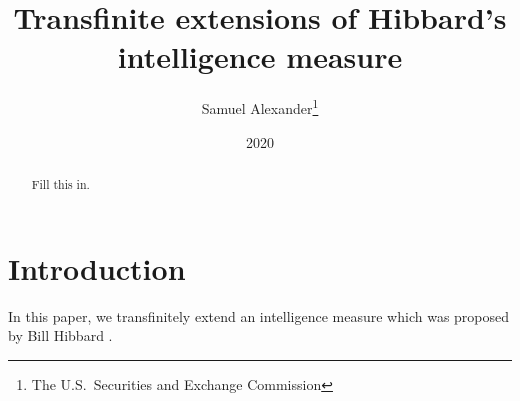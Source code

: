\documentclass{article}
\title{Transfinite extensions of Hibbard's intelligence measure}
\author{Samuel Alexander\thanks{The U.S.\ Securities and Exchange Commission}}
\date{2020}
\begin{document}
\maketitle

\begin{abstract}
    Fill this in.
\end{abstract}

\section{Introduction}

In this paper, we transfinitely extend an intelligence measure which was
proposed by Bill Hibbard \cite{hibbard}.



\end{document}
